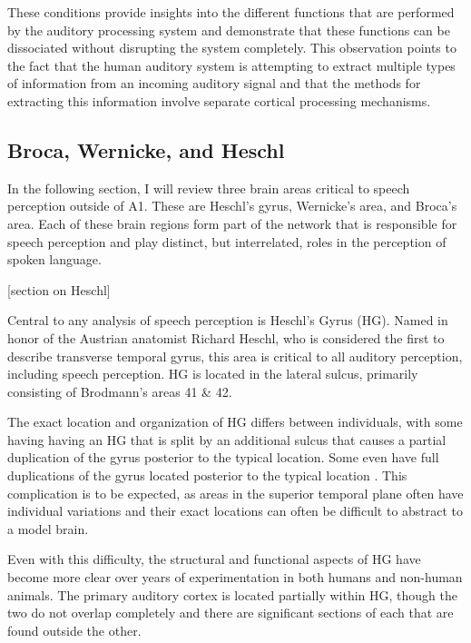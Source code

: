 \documentclass[titlepage]{article}
\begin{document}
    These conditions provide insights into the different functions that are
    performed by the auditory processing system and demonstrate that these
    functions can be dissociated without disrupting the system completely. This
    observation points to the fact that the human auditory system is attempting
    to extract multiple types of information from an incoming auditory signal
    and that the methods for extracting this information involve separate
    cortical processing mechanisms.

  \subsection{Broca, Wernicke, and Heschl}

    In the following section, I will review three brain areas critical to
    speech perception outside of A1. These are Heschl's gyrus, Wernicke's 
    area, and Broca's area. Each of these brain regions form part of the network
    that is responsible for speech perception and play distinct, but
    interrelated, roles in the perception of spoken language.

    [section on Heschl]

    Central to any analysis of speech perception is Heschl's Gyrus (HG). Named 
    in honor of the Austrian anatomist Richard Heschl, who is considered the
    first to describe transverse temporal gyrus, this area is critical to all
    auditory perception, including speech perception. HG is located in the 
    lateral sulcus, primarily consisting of Brodmann's areas 41 \& 42.

    The exact location and organization of HG differs between individuals, with 
    some having having an HG that is split by an additional sulcus that causes 
    a partial duplication of the gyrus posterior to the typical location. 
    Some even have
    full duplications of the gyrus located posterior to 
    the typical location \cite{Marie2015, Leonard1998}.
    This complication is to be expected, as areas in the superior temporal plane
    often have individual variations and their exact locations can often be 
    difficult to abstract to a model brain.

    Even with this difficulty, the structural and functional aspects of HG 
    have become more clear over years of experimentation in both humans 
    and non-human animals. The primary auditory cortex is located partially 
    within HG, though the two do not overlap completely and there are 
    significant sections of each that are found outside the other.
\end{document}
